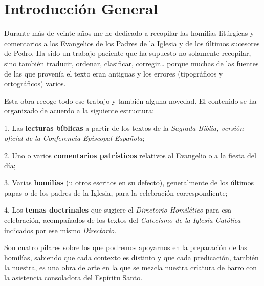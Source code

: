 \chapter{Introducción General}

\begin{bodyintro}Durante más de veinte años me he dedicado a recopilar las homilías litúrgicas y comentarios a los Evangelios de los Padres de la Iglesia y de los últimos sucesores de Pedro. Ha sido un trabajo paciente que ha supuesto no solamente recopilar, sino también traducir, ordenar, clasificar, corregir… porque muchas de las fuentes de las que provenía el texto eran antiguas y los errores (tipográficos y ortográficos) varios.\end{bodyintro}

\begin{bodyintro}Esta obra recoge todo ese trabajo y también alguna novedad. El contenido se ha organizado de acuerdo a la siguiente estructura:\end{bodyintro}

\begin{bodyintro}1. Las \textbf{lecturas bíblicas} a partir de los textos de la \textit{Sagrada Biblia, versión oficial de la Conferencia Episcopal Española};\end{bodyintro}

\begin{bodyintro}2. Uno o varios \textbf{comentarios patrísticos} relativos al Evangelio o a la fiesta del día;\end{bodyintro}

\begin{bodyintro}3. Varias \textbf{homilías }(u otros escritos en su defecto), generalmente de los últimos papas o de los padres de la Iglesia, para la celebración correspondiente;\end{bodyintro}

\begin{bodyintro}4. Los \textbf{temas doctrinales} que sugiere el \textit{Directorio Homilético} para esa celebración, acompañados de los textos del \textit{Catecismo de la Iglesia Católica} indicados por ese mismo \textit{Directorio}.\end{bodyintro}

\begin{bodyintro}Son cuatro pilares sobre los que podremos apoyarnos en la preparación de las homilías, sabiendo que cada contexto es distinto y que cada predicación, también la nuestra, es una obra de arte en la que se mezcla nuestra criatura de barro con la asistencia consoladora del Espíritu Santo.\end{bodyintro}
\newpage
